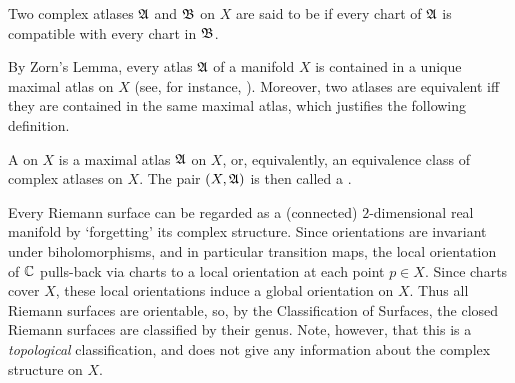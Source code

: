 \documentclass[../Moduli_Spaces_of_Riemann_Surfaces.tex]{subfiles}
\begin{document}
    \begin{definition}
        Two complex atlases $\mathfrak{A}$ and $\mathfrak{B}$ on $X$ are said to be  if every chart of $\mathfrak{A}$ is compatible with every chart in $\mathfrak{B}$.
    \end{definition}
    \begin{remark}
        By Zorn's Lemma, every atlas $\mathfrak{A}$ of a manifold $X$ is contained in a unique maximal atlas on $X$ (see, for instance, \cite[][Proposition 1.17]{leeSM}). Moreover, two atlases are equivalent iff they are contained in the same maximal atlas, which justifies the following definition.\exqed
    \end{remark}
    \begin{definition}
        A  on $X$ is a  maximal atlas $\mathfrak{A}$ on $X$, or, equivalently, an equivalence class of complex atlases on $X$. The pair $\left(X,\mathfrak{A}\right)$ is then called a .
    \end{definition}
    \begin{remark}
        Every Riemann surface can be regarded as a (connected) $2$-dimensional real manifold by $\textrm{`}$forgetting$\textrm{'}$ its complex structure. Since orientations are invariant under biholomorphisms, and in particular transition maps, the local orientation of $\mathbb{C}$ pulls-back via charts to a local orientation at each point $p\in X$. Since charts cover $X$, these local orientations induce a global orientation on $X$. Thus all Riemann surfaces are orientable, so, by the Classification of Surfaces, the closed Riemann surfaces are classified by their genus. Note, however, that this is a \textit{topological} classification, and does not give any information about the complex structure on $X$.\exqed
    \end{remark}
\end{document}
